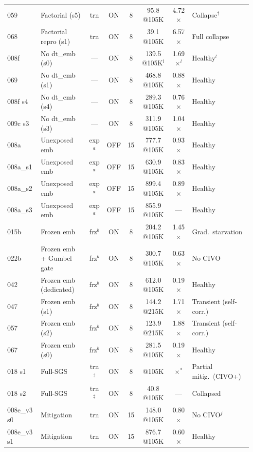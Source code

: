 \begin{table}[t]
\begin{tabular}{llcccccl}
059 & Factorial (s5) & trn & ON & 8 & 95.8 @105K & 4.72$\times$ & Collapse$^\dagger$ \\
\rowcolor{gray!15}
068 & Factorial repro (s1) & trn & ON & 8 & 39.1 @105K & 6.57$\times$ & Full collapse \\
008f & No dt\_emb (s0) & --- & ON & 8 & 139.5 @105K$^l$ & 1.69$\times$$^l$ & Healthy$^l$ \\
069 & No dt\_emb (s1) & --- & ON & 8 & 468.8 @105K & 0.88$\times$ & Healthy \\
008f s4 & No dt\_emb (s4) & --- & ON & 8 & 289.3 @105K & 0.76$\times$ & Healthy \\
009c s3 & No dt\_emb (s3) & --- & ON & 8 & 311.9 @105K & 1.04$\times$ & Healthy \\
008a & Unexposed emb & exp$^a$ & OFF & 15 & 777.7 @105K & 0.93$\times$ & Healthy \\
008a\_s1 & Unexposed emb & exp$^a$ & OFF & 15 & 630.9 @105K & 0.83$\times$ & Healthy \\
008a\_s2 & Unexposed emb & exp$^a$ & OFF & 15 & 899.4 @105K & 0.89$\times$ & Healthy \\
008a\_s3 & Unexposed emb & exp$^a$ & OFF & 15 & 855.9 @105K & --- & Healthy \\
015b & Frozen emb & frz$^b$ & ON & 8 & 204.2 @105K & 1.45$\times$ & Grad.\ starvation \\
022b & Frozen emb + Gumbel gate & frz$^b$ & ON & 8 & 300.7 @105K & 0.63$\times$ & No CIVO \\
042 & Frozen emb (dedicated) & frz$^b$ & ON & 8 & 612.0 @105K & 0.19$\times$ & Healthy \\
047 & Frozen emb (s1) & frz$^b$ & ON & 8 & 144.2 @215K & 1.71$\times$ & Transient (self-corr.) \\
057 & Frozen emb (s2) & frz$^b$ & ON & 8 & 123.9 @215K & 1.88$\times$ & Transient (self-corr.) \\
067 & Frozen emb (s0) & frz$^b$ & ON & 8 & 281.5 @105K & 0.19$\times$ & Healthy \\
\midrule
018 s1 & Full-SGS & trn$^\ddagger$ & ON & 8 & \sgseval{} @105K & \sgsnve{}$\times$$^*$ & Partial mitig.\ (CIVO+) \\
\rowcolor{gray!15}
018 s2 & Full-SGS & trn$^\ddagger$ & ON & 8 & 40.8 @105K & --- & Collapsed \\
008e\_v3 s0 & Mitigation & trn & ON & 15 & 148.0 @105K & 0.80$\times$ & No CIVO$^j$ \\
008e\_v3 s1 & Mitigation & trn & ON & 15 & 876.7 @105K & 0.60$\times$ & Healthy \\

\end{tabular}
\end{table}
